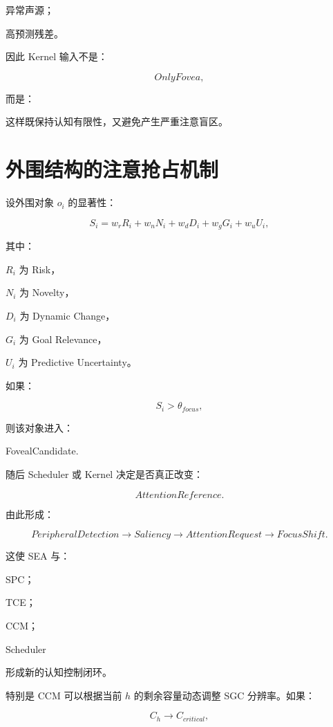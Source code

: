 异常声源；

高预测残差。

因此 Kernel 输入不是：

\[
OnlyFovea,
\]

而是：

\begin{statementbox}
\centering
{}
\end{statementbox}

这样既保持认知有限性，又避免产生严重注意盲区。

\section{外围结构的注意抢占机制}

设外围对象 $o_i$ 的显著性：

\[
S_i
=
w_rR_i
+
w_nN_i
+
w_dD_i
+
w_gG_i
+
w_uU_i,
\]

其中：

$R_i$ 为 Risk，

$N_i$ 为 Novelty，

$D_i$ 为 Dynamic Change，

$G_i$ 为 Goal Relevance，

$U_i$ 为 Predictive Uncertainty。

如果：

\[
S_i>\theta_{focus},
\]

则该对象进入：

\begin{statementbox}
FovealCandidate.
\end{statementbox}

随后 Scheduler 或 Kernel 决定是否真正改变：

\[
AttentionReference.
\]

由此形成：

\[
PeripheralDetection
\rightarrow
Saliency
\rightarrow
AttentionRequest
\rightarrow
FocusShift.
\]

这使 SEA 与：

SPC；

TCE；

CCM；

Scheduler

形成新的认知控制闭环。

特别是 CCM 可以根据当前 $h$ 的剩余容量动态调整 SGC 分辨率。如果：

\[
C_h\rightarrow C_{critical},
\]

